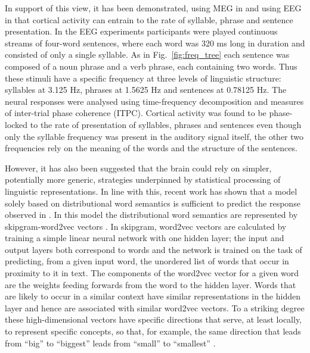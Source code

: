 \documentclass[11pt,a4wide]{article}
\begin{document}
In support of this view, it has been demonstrated, using MEG in
\cite{DingEtAl2016} and using EEG in \cite{DingEtAl2017} that cortical
activity can entrain to the rate of syllable, phrase and sentence
presentation. In the EEG experiments participants were played
continuous streams of four-word sentences, where each word was 320 ms
long in duration and consisted of only a single syllable. As in
Fig.~\ref{fig:freq_tree} each sentence was composed of a noun phrase
and a verb phrase, each containing two words. Thus these stimuli
have a specific frequency at three levels of linguistic structure:
syllables at 3.125 Hz, phrases at 1.5625 Hz and sentences at 0.78125
Hz. The neural responses were analysed using time-frequency
decomposition and measures of inter-trial phase coherence
(ITPC). Cortical activity was found to be phase-locked to the rate of
presentation of syllables, phrases and sentences even though only the
syllable frequency was present in the auditory signal itself, the other
two frequencies rely on the meaning of the words and the structure of
the sentences.

However, it has also been suggested that the brain could rely on
simpler, potentially more generic, strategies underpinned by
statistical processing of linguistic representations. In line with
this, recent work \cite{FrankYang2018} has shown that a model solely
based on distributional word semantics is sufficient to predict the
response observed in \cite{DingEtAl2016, DingEtAl2017}. In this model
the distributional word semantics are represented by skipgram-word2vec
vectors \cite{MikolovEtAl2013,Bojanowski2017}. In skipgram, word2vec
vectors are calculated by training a simple linear neural network with
one hidden layer; the input and output layers both correspond to words
and the network is trained on the task of predicting, from a given
input word, the unordered list of words that occur in proximity to it
in text. The components of the word2vec vector for a given word are
the weights feeding forwards from the word to the hidden layer. Words
that are likely to occur in a similar context have similar
representations in the hidden layer and hence are associated with
similar word2vec vectors. To a striking degree these high-dimensional
vectors have specific directions that serve, at least locally, to
represent specific concepts, so that, for example, the same direction
that leads from ``big'' to ``biggest'' leads from ``small'' to
``smallest'' \cite{MikolovEtAl2013b, MikolovEtAl2013c}.
\end{document}
